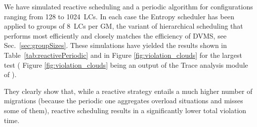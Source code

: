 
We have simulated reactive scheduling and a periodic algorithm for
configurations ranging from 128 to 1024~LCs. In each case the Entropy
scheduler has been applied to groups of 8~LCs per GM, the variant of
hierarchical scheduling that performs most efficiently and closely
matches the efficiency of DVMS, see Sec.~\ref{sec:groupSizes}.
These simulations have yielded the results shown in
Table~\ref{tab:reactivePeriodic} and in Figure
\ref{fig:violation_clouds} for the largest test (
Figure \ref{fig:violation_clouds} being an output of the Trace
analysis module of \vmps).

They clearly show that, while a
reactive strategy entails a much higher number of migrations (because
the periodic one aggregates overload situations and misses some of
them), reactive scheduling results in a significantly lower total
violation time.






